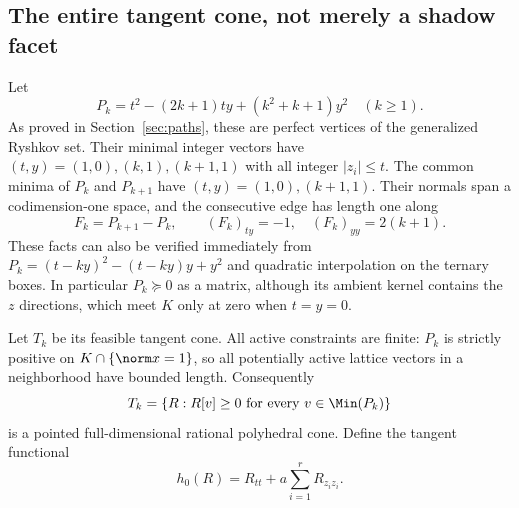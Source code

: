 \subsection{The entire tangent cone, not merely a shadow facet}
Let
\[
 P_k=t^2-(2k+1)ty+(k^2+k+1)y^2\quad(k\ge1).
\]
As proved in Section~\ref{sec:paths}, these are perfect vertices of the generalized Ryshkov set. Their minimal integer vectors have $(t,y)=(1,0),(k,1),(k+1,1)$ with all integer $|z_i|\le t$. The common minima of $P_k$ and $P_{k+1}$ have $(t,y)=(1,0),(k+1,1)$. Their normals span a codimension-one space, and the consecutive edge has length one along
\[
 F_k=P_{k+1}-P_k,\qquad(F_k)_{ty}=-1,\quad(F_k)_{yy}=2(k+1).
\]
These facts can also be verified immediately from $P_k=(t-ky)^2-(t-ky)y+y^2$ and quadratic interpolation on the ternary boxes. In particular $P_k\succeq0$ as a matrix, although its ambient kernel contains the $z$ directions, which meet $K$ only at zero when $t=y=0$.

Let $T_k$ be its feasible tangent cone. All active constraints are finite: $P_k$ is strictly positive on $K\cap\{\norm x=1\}$, so all potentially active lattice vectors in a neighborhood have bounded length. Consequently
\[
 T_k=\{R:R[v]\ge0\text{ for every }v\in\Min(P_k)\}
\]
is a pointed full-dimensional rational polyhedral cone.
Define the tangent functional
\begin{equation}\label{eq:allhzero}
 h_0(R)=R_{tt}+a\sum_{i=1}^r R_{z_iz_i}.
\end{equation}

